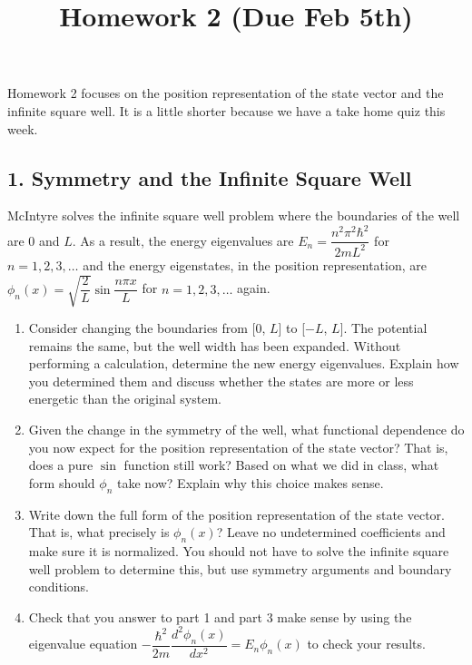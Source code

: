 \documentclass[
]{article}
\title{Homework 2 (Due Feb 5th)}
\author{}
\date{}
\providecommand{\tightlist}{%
  \setlength{\itemsep}{0pt}\setlength{\parskip}{0pt}}
\providecommand{\tightlist}{%
  \setlength{\itemsep}{0pt}\setlength{\parskip}{0pt}}
\begin{document}
\maketitle

Homework 2 focuses on the position representation of the state vector
and the infinite square well. It is a little shorter because we have a
take home quiz this week.

\hypertarget{symmetry-and-the-infinite-square-well}{%
\subsection{1. Symmetry and the Infinite Square
Well}\label{symmetry-and-the-infinite-square-well}}

McIntyre solves the infinite square well problem where the boundaries of
the well are 0 and \(L\). As a result, the energy eigenvalues are
\(E_n = \dfrac{n^2\pi^2\hbar^2}{2mL^2}\) for \(n = 1,2,3,\dots\) and the
energy eigenstates, in the position representation, are
\(\phi_n(x) = \sqrt{\dfrac{2}{L}} \sin \dfrac{n\pi x}{L}\) for
\(n = 1,2,3,\dots\) again.

\begin{enumerate}
\def\labelenumi{\arabic{enumi}.}
\tightlist
\item
  Consider changing the boundaries from {[}0, \(L\){]} to {[}\(-L\),
  \(L\){]}. The potential remains the same, but the well width has been
  expanded. Without performing a calculation, determine the new energy
  eigenvalues. Explain how you determined them and discuss whether the
  states are more or less energetic than the original system.
\item
  Given the change in the symmetry of the well, what functional
  dependence do you now expect for the position representation of the
  state vector? That is, does a pure \(\sin\) function still work? Based
  on what we did in class, what form should \(\phi_n\) take now? Explain
  why this choice makes sense.
\item
  Write down the full form of the position representation of the state
  vector. That is, what precisely is \(\phi_n(x)\)? Leave no
  undetermined coefficients and make sure it is normalized. You should
  not have to solve the infinite square well problem to determine this,
  but use symmetry arguments and boundary conditions.
\item
  Check that you answer to part 1 and part 3 make sense by using the
  eigenvalue equation
  \(-\dfrac{\hbar^2}{2m} \dfrac{d^2\phi_n(x)}{dx^2} = E_n \phi_n(x)\) to
  check your results.
\end{enumerate}
\end{document}
